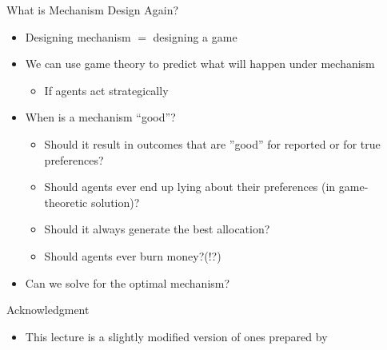 \documentclass[11pt,aspectratio=169]{beamer}
\begin{document}
  \begin{frame}{What is Mechanism Design Again?}
   \begin{itemize}[<+->]
   \setlength{\itemsep}{1.2em}
    \item Designing mechanism $=$ designing a game
    \item We can use game theory to predict what will happen under mechanism
    \begin{itemize}
     \item If agents act strategically
    \end{itemize}     
    \item When is a mechanism ``good''?
    \begin{itemize}
     \item Should it result in outcomes that are ''good'' for \alert{reported} or for \alert{true} preferences?
     \item Should agents ever end up lying about their preferences (in game-theoretic solution)?
     \item Should it always generate the best allocation?
     \item Should agents ever burn money?(!?)
    \end{itemize}
    \item Can we solve for the optimal mechanism?
   \end{itemize}
  \end{frame}
  
  \begin{frame}{Acknowledgment}
   \begin{itemize}
    \setlength{\itemsep}{1em}
    \item This lecture is a slightly modified version of ones prepared by
   \end{itemize}
  \end{frame}
 
\end{document}
